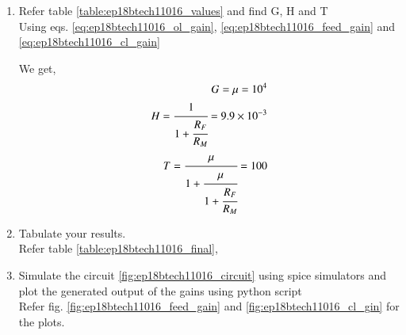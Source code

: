 \begin{enumerate}[label=\arabic*.,ref=\theenumi]
\item Refer table \ref{table:ep18btech11016_values} and find G, H and T
\\
\solution Using eqs. \ref{eq:ep18btech11016_ol_gain}, \ref{eq:ep18btech11016_feed_gain} and \ref{eq:ep18btech11016_cl_gain}

We get,
\begin{align}
    G = \mu = 10^4\\
    H = \cfrac{ 1 }{1 + \cfrac{R_F}{R_M}} = 9.9 \times 10^{-3}\\
    T = \cfrac{\mu}{1 + \cfrac{\mu}{1 + \cfrac{R_F}{R_M}}} = 100
\end{align}

\begin{table}[!ht]
    \centering
    
    \caption{}
    \label{table:ep18btech11016_values}
\end{table}


\item Tabulate your results.
\\
\solution Refer table \ref{table:ep18btech11016_final},

\begin{table}[!ht]
    \centering
    
    \caption{}
    \label{table:ep18btech11016_final}
\end{table}


\item Simulate the circuit \ref{fig:ep18btech11016_circuit} using spice simulators and plot the generated output of the gains using python script
\\
\solution Refer fig. \ref{fig:ep18btech11016_feed_gain} and \ref{fig:ep18btech11016_cl_gin} for the plots.


\end{enumerate}
